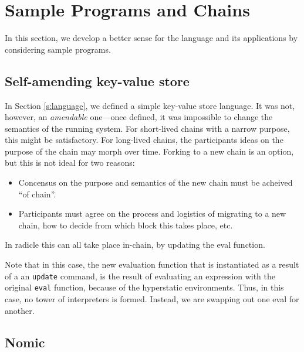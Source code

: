 \section{Sample Programs and Chains}

In this section, we develop a better sense for the language and its
applications by considering sample programs.

\subsection{Self-amending key-value store}

In Section \ref{s:language}, we defined a simple key-value store language. It
was not, however, an \emph{amendable} one---once defined, it was impossible to
change the semantics of the running system. For short-lived chains with a narrow
purpose, this might be satisfactory. For long-lived chains, the participants
ideas on the purpose of the chain may morph over time. Forking to a new chain is
an option, but this is not ideal for two reasons:
\begin{itemize}
  \item Concensus on the purpose and semantics of the new chain must be acheived
    ``of chain''.
  \item Participants must agree on the process and logistics of migrating to a
    new chain, how to decide from which block this takes place, etc.
\end{itemize}
In radicle this can all take place in-chain, by updating the eval function.



Note that in this case, the new evaluation function that is instantiated as a
result of a an \texttt{update} command, is the result of evaluating an
expression with the original \texttt{eval} function, because of the hyperstatic
environments. Thus, in this case, no tower of interpreters is formed. Instead,
we are swapping out one eval for another.

\subsection{Nomic}
\label{s:examples}
